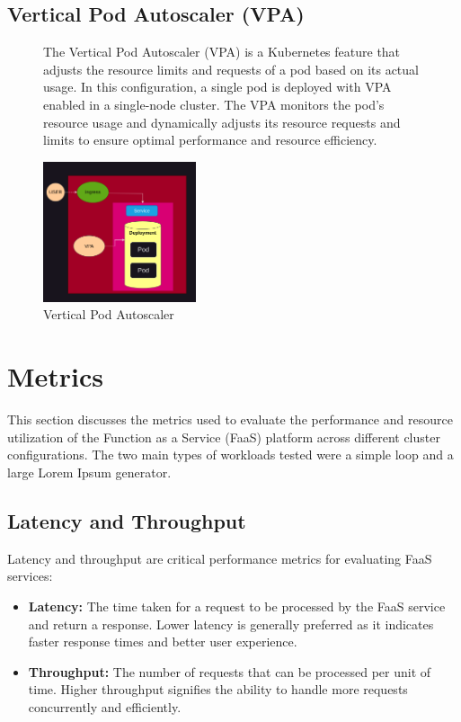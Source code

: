 \documentclass{article}
\begin{document}
\subsection{Vertical Pod Autoscaler (VPA)}
\begin{figure}[h]
    \begin{minipage}[b]{0.6\textwidth}
        \flushleft
        The Vertical Pod Autoscaler (VPA) is a Kubernetes feature that adjusts the
        resource limits and requests of a pod based on its actual usage. In this
        configuration, a single pod is deployed with VPA enabled in a single-node
        cluster. The VPA monitors the pod's resource usage and dynamically adjusts its
        resource requests and limits to ensure optimal performance and resource
        efficiency.
    \end{minipage}%
    \hfill
    \begin{minipage}[b]{0.4\textwidth}
        \centering
        \includegraphics[width=0.4\textwidth]{../images/vpa.png}
        \caption{Vertical Pod Autoscaler}
        \label{fig:vpa}
    \end{minipage}
\end{figure}
\newpage
\section{Metrics}
This section discusses the metrics used to evaluate the performance and resource utilization of the Function as a Service (FaaS) platform across different cluster configurations. The two main types of workloads tested were a simple loop and a large Lorem Ipsum generator.

\subsection{Latency and Throughput}
Latency and throughput are critical performance metrics for evaluating FaaS services:

\begin{itemize}
    \item \textbf{Latency:} The time taken for a request to be processed by the FaaS service and return a response. Lower latency is generally preferred as it indicates faster response times and better user experience.
    \item \textbf{Throughput:} The number of requests that can be processed per unit of time. Higher throughput signifies the ability to handle more requests concurrently and efficiently.
\end{itemize}
\end{document}
